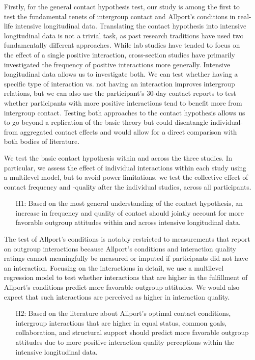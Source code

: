 \documentclass[man, 12pt, a4paper, mask]{apa7}
\theoremstyle{break}
\theoremstyle{plain}
\begin{document}
Firstly, for the general contact hypothesis test, our study is among the first to test the fundamental tenets of intergroup contact and Allport's conditions in real-life intensive longitudinal data. Translating the contact hypothesis into intensive longitudinal data is not a trivial task, as past research traditions have used two fundamentally different approaches. While lab studies have tended to focus on the effect of a single positive interaction, cross-section studies have primarily investigated the frequency of positive interactions more generally. Intensive longitudinal data allows us to investigate both. We can test whether having a specific type of interaction vs. not having an interaction improves intergroup relations, but we can also use the participant's 30-day contact reports to test whether participants with more positive interactions tend to benefit more from intergroup contact. Testing both approaches to the contact hypothesis allows us to go beyond a replication of the basic theory but could disentangle individual- from aggregated contact effects and would allow for a direct comparison with both bodies of literature. 

We test the basic contact hypothesis within and across the three studies. In particular, we assess the effect of individual interactions within each study using a multilevel model, but to avoid power limitations, we test the collective effect of contact frequency and -quality after the individual studies, across all participants.
\begin{enumerate}[leftmargin=1.5\parindent]
    \item[H1:] Based on the most general understanding of the contact hypothesis, an increase in frequency and quality of contact should jointly account for more favorable outgroup attitudes within and across intensive longitudinal data.
\end{enumerate}

The test of Allport's conditions is notably restricted to measurements that report on outgroup interactions because Allport's conditions and interaction quality ratings cannot meaningfully be measured or imputed if participants did not have an interaction. Focusing on the interactions in detail, we use a multilevel regression model to test whether interactions that are higher in the fulfillment of Allport's conditions predict more favorable outgroup attitudes. We would also expect that such interactions are perceived as higher in interaction quality.
\begin{enumerate}[leftmargin=1.5\parindent]
    \item[H2:] Based on the literature about Allport’s optimal contact conditions, intergroup interactions that are higher in equal status, common goals, collaboration, and structural support should predict more favorable outgroup attitudes due to more positive interaction quality perceptions within the intensive longitudinal data.
\end{enumerate}
\end{document}
